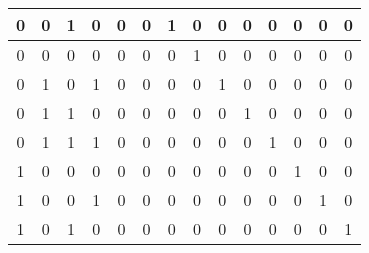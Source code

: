 \documentclass[dvipdfmx]{jsarticle}
\begin{document}
\begin{enumerate}
\begin{itemize}
\begin{table}[H]
\begin{tabular}{|c|c|c|c|c|c|c|c|c|c|c|c|c|c|}
										0 &     0 &     1 &     0 & 0 & 0 & 1 & 0 & 0 & 0 & 0 & 0 & 0 & 0 \\ \hline
										0 &     0 &     0 &     0 & 0 & 0 & 0 & 1 & 0 & 0 & 0 & 0 & 0 & 0 \\ \hline
										0 &     1 &     0 &     1 & 0 & 0 & 0 & 0 & 1 & 0 & 0 & 0 & 0 & 0 \\ \hline
										0 &     1 &     1 &     0 & 0 & 0 & 0 & 0 & 0 & 1 & 0 & 0 & 0 & 0 \\ \hline
										0 &     1 &     1 &     1 & 0 & 0 & 0 & 0 & 0 & 0 & 1 & 0 & 0 & 0 \\ \hline
										1 &     0 &     0 &     0 & 0 & 0 & 0 & 0 & 0 & 0 & 0 & 1 & 0 & 0 \\ \hline
										1 &     0 &     0 &     1 & 0 & 0 & 0 & 0 & 0 & 0 & 0 & 0 & 1 & 0 \\ \hline
										1 &     0 &     1 &     0 & 0 & 0 & 0 & 0 & 0 & 0 & 0 & 0 & 0 & 1 \\ \hline
								\end{tabular}
							\end{table}
					\end{itemize}
				\end{enumerate}
\end{document}
